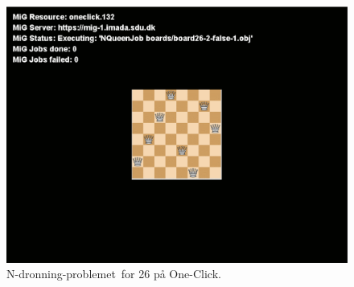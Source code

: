 \documentclass[final,a4paper,11pt]{article}
\newcommand{\oc}{One-Click}
\newcommand{\nq}{N-dronning-problemet}
\begin{document}
\begin{landscape}
\begin{figure}
\includegraphics{actionshot.pdf}
\caption{\nq\ for 26 på \oc.}
\label{fig:action}
\end{figure}
\end{landscape}

%
%

%
%
\end{document}
